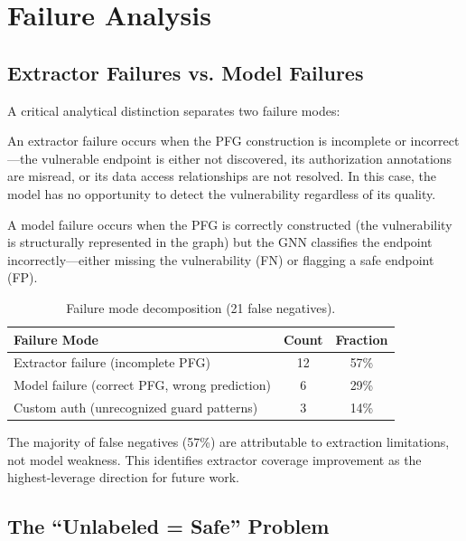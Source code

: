 \section{Failure Analysis}
\label{sec:failure-analysis}

\subsection{Extractor Failures vs. Model Failures}

A critical analytical distinction separates two failure modes:

\begin{definition}
An extractor failure occurs when the PFG construction is incomplete or incorrect—the vulnerable endpoint is either not discovered, its authorization annotations are misread, or its data access relationships are not resolved. In this case, the model has no opportunity to detect the vulnerability regardless of its quality.
\end{definition}

\begin{definition}
A model failure occurs when the PFG is correctly constructed (the vulnerability is structurally represented in the graph) but the GNN classifies the endpoint incorrectly—either missing the vulnerability (FN) or flagging a safe endpoint (FP).
\end{definition}

\begin{table}[htbp]
\centering
\caption{Failure mode decomposition (21 false negatives).}
\label{tab:failure-modes}
\begin{tabular}{@{}lcc@{}}
\toprule
\textbf{Failure Mode} & \textbf{Count} & \textbf{Fraction} \\
\midrule
Extractor failure (incomplete PFG) & 12 & 57\% \\
Model failure (correct PFG, wrong prediction) & 6 & 29\% \\
Custom auth (unrecognized guard patterns) & 3 & 14\% \\
\bottomrule
\end{tabular}
\end{table}

The majority of false negatives (57\%) are attributable to extraction limitations, not model weakness. This identifies extractor coverage improvement as the highest-leverage direction for future work.

\subsection{The ``Unlabeled = Safe'' Problem}

